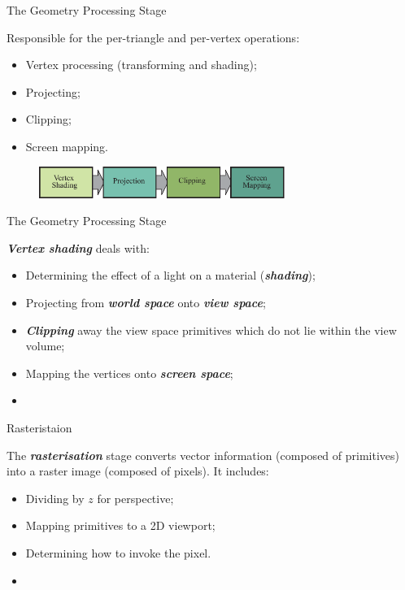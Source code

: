 \documentclass{beamer}
\newcommand{\emphbf}[1]{\textbf{\emph{#1}}}
\begin{document}
\begin{frame}{The Geometry Processing Stage}

	Responsible for the per-triangle and per-vertex operations:

	\begin{itemize}
		\item Vertex processing (transforming and shading);
		\item Projecting;
		\item Clipping;
		\item Screen mapping.
	\end{itemize}

	\vskip 1cm

	\begin{figure}[t]
		\includegraphics[width=8cm]{geometry-pipeline}
		\centering
	\end{figure}

\end{frame}

\begin{frame}{The Geometry Processing Stage}

	\emphbf{Vertex shading} deals with:

	\begin{itemize}
		\item Determining the effect of a light on a material (\emphbf{shading});
		\item Projecting from \emphbf{world space} onto \emphbf{view space};
		\item \emphbf{Clipping} away the view space primitives which do not lie within the view volume;
		\item Mapping the vertices onto \emphbf{screen space};
	\end{itemize}

	\vskip 1cm

	\begin{itemize}
		\item
	\end{itemize}

\end{frame}

\begin{frame}{Rasteristaion}

	The \emphbf{rasterisation} stage converts vector information (composed of primitives) into a raster image (composed of pixels). It includes:

	\begin{itemize}
		\item Dividing by $z$ for perspective;
		\item Mapping primitives to a 2D viewport;
		\item Determining how to invoke the pixel.
	\end{itemize}

	\vskip 1cm

	\begin{itemize}
		\item
	\end{itemize}

\end{frame}
\end{document}
